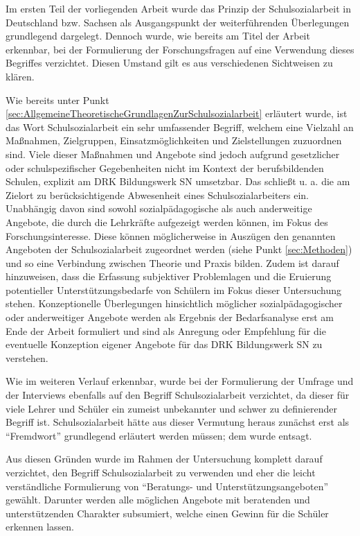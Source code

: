 \noindent
Im ersten Teil der vorliegenden Arbeit wurde das Prinzip der Schulsozialarbeit in Deutschland bzw. Sachsen als Ausgangspunkt der weiterführenden Überlegungen grundlegend dargelegt. Dennoch wurde, wie bereits am Titel der Arbeit erkennbar, bei der Formulierung der Forschungsfragen auf eine Verwendung dieses Begriffes verzichtet. Diesen Umstand gilt es aus verschiedenen Sichtweisen zu klären.
 
Wie bereits unter Punkt \ref{sec:AllgemeineTheoretischeGrundlagenZurSchulsozialarbeit} erläutert wurde, ist das Wort Schulsozialarbeit ein sehr umfassender Begriff, welchem eine Vielzahl an Maßnahmen, Zielgruppen, Einsatzmöglichkeiten und Zielstellungen zuzuordnen sind. Viele dieser Maßnahmen und Angebote sind jedoch aufgrund gesetzlicher oder schulspezifischer Gegebenheiten nicht im Kontext der berufsbildenden Schulen, explizit am DRK Bildungswerk SN umsetzbar. Das schließt u. a. die am Zielort zu berücksichtigende Abwesenheit eines Schulsozialarbeiters ein. Unabhängig davon sind sowohl sozialpädagogische als auch anderweitige Angebote, die durch die Lehrkräfte aufgezeigt werden können, im Fokus des Forschungsinteresse. Diese können möglicherweise in Auszügen den genannten Angeboten der Schulsozialarbeit zugeordnet werden (siehe Punkt \ref{sec:Methoden}) und so eine Verbindung zwischen Theorie und Praxis bilden. Zudem ist darauf hinzuweisen, dass die Erfassung subjektiver Problemlagen und die Eruierung potentieller Unterstützungsbedarfe von Schülern im Fokus dieser Untersuchung stehen. Konzeptionelle Überlegungen hinsichtlich möglicher sozialpädagogischer oder anderweitiger Angebote werden als Ergebnis der Bedarfsanalyse erst am Ende der Arbeit formuliert und sind als Anregung oder Empfehlung für die eventuelle Konzeption eigener Angebote für das DRK Bildungswerk SN zu verstehen.
 
Wie im weiteren Verlauf erkennbar, wurde bei der Formulierung der Umfrage und der Interviews ebenfalls auf den Begriff Schulsozialarbeit verzichtet, da dieser für viele Lehrer und Schüler ein zumeist unbekannter und schwer zu definierender Begriff ist. Schulsozialarbeit hätte aus dieser Vermutung heraus zunächst erst als "`Fremdwort"' grundlegend erläutert werden müssen; dem wurde entsagt.

Aus diesen Gründen wurde im Rahmen der Untersuchung komplett darauf verzichtet, den Begriff Schulsozialarbeit zu verwenden und eher die leicht verständliche Formulierung von "`Beratungs- und Unterstützungsangeboten"' gewählt. Darunter werden alle möglichen Angebote mit beratenden und unterstützenden Charakter subsumiert, welche einen Gewinn für die Schüler erkennen lassen.

